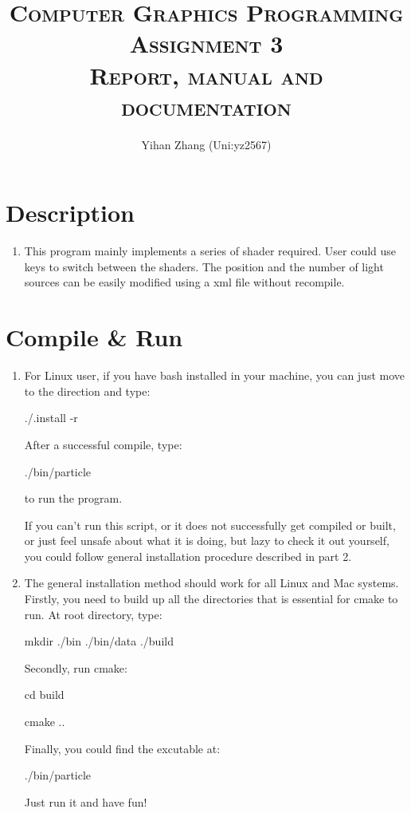 \documentclass{article}
\begin{document}
\title{{\scshape Computer Graphics Programming Assignment 3 \\ {\large Report, manual and documentation}}}
\author{Yihan Zhang (Uni:yz2567)}
\maketitle

\section{Description}

\begin{enumerate}[\hspace{5pt}]
	\item This program mainly implements a series of shader required. User could use keys to switch between the shaders. The position and the number of light sources can be easily modified using a xml file without recompile.
\end{enumerate}

\section{Compile \& Run}

	\begin{enumerate}
	
		\item For Linux user, if you have bash installed in your machine, you can just move to the direction and type:

			{\hspace{5pt}\ttfamily ./.install -r}

			After a successful compile, type: 
			
			{\hspace{5pt}\ttfamily ./bin/particle}

			to run the program.

			If you can't run this script, or it does not successfully get compiled or built, or just feel unsafe about what it is doing, but lazy to check it out yourself, you could follow general installation procedure described in part 2.

		\item The general installation method should work for all Linux and Mac systems. 
			Firstly, you need to build up all the directories that is essential for cmake to run. At root directory, type:

			{\hspace{5pt} \ttfamily mkdir ./bin ./bin/data ./build}

			Secondly, run cmake:

			{\hspace{5pt}\ttfamily cd build}
			
			{\hspace{5pt}\ttfamily cmake ..}

			Finally, you could find the excutable at:
			
			{\hspace{5pt}\ttfamily ./bin/particle}

			Just run it and have fun!

	\end{enumerate}
\end{document}
